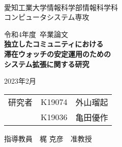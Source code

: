 \begin{titlepage}

  \ \\
  \begin{center}

    {\LARGE 愛知工業大学情報科学部情報科学科\\
      コンピュータシステム専攻

      \vspace{1.0cm}

      令和4年度~卒業論文\\

      \vspace{2.0cm}
      {\Huge
        \baselineskip=15mm
        \textbf{独立したコミュニティにおける\\滞在ウォッチの安定運用のための\\システム拡張に関する研究\\}}

      \vspace{7.0cm}

      2023年2月\\

      \vspace{1.0cm}

      \begin{tabular}[h]{lll}
        研究者 & K19074 & 外山瑠起 \\
            & K19036 & 亀田優作 \\
      \end{tabular}

      \vspace{1.0cm}

      指導教員\ \
      梶 克彦\ \
      准教授
    }

  \end{center}

\end{titlepage}
